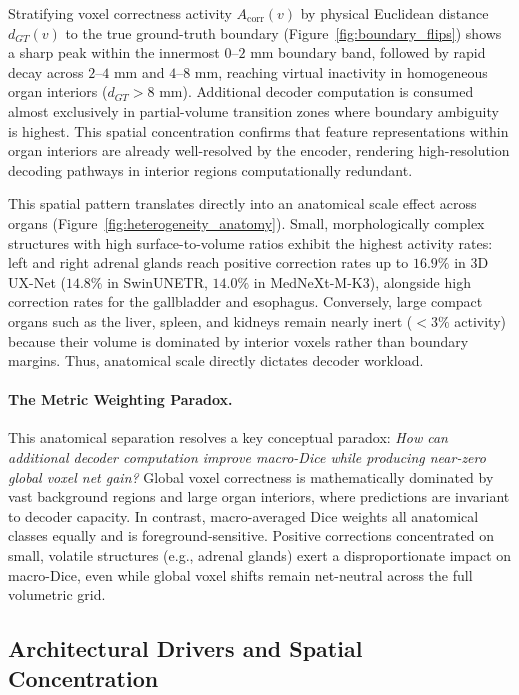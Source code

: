 Stratifying voxel correctness activity $A_{\text{corr}}(v)$ by physical Euclidean distance $d_{GT}(v)$ to the true ground-truth boundary (Figure~\ref{fig:boundary_flips}) shows a sharp peak within the innermost $0\text{--}2\text{ mm}$ boundary band, followed by rapid decay across $2\text{--}4\text{ mm}$ and $4\text{--}8\text{ mm}$, reaching virtual inactivity in homogeneous organ interiors ($d_{GT} > 8\text{ mm}$). Additional decoder computation is consumed almost exclusively in partial-volume transition zones where boundary ambiguity is highest. This spatial concentration confirms that feature representations within organ interiors are already well-resolved by the encoder, rendering high-resolution decoding pathways in interior regions computationally redundant.

This spatial pattern translates directly into an anatomical scale effect across organs (Figure~\ref{fig:heterogeneity_anatomy}). Small, morphologically complex structures with high surface-to-volume ratios exhibit the highest activity rates: left and right adrenal glands reach positive correction rates up to $16.9\%$ in 3D UX-Net ($14.8\%$ in SwinUNETR, $14.0\%$ in MedNeXt-M-K3), alongside high correction rates for the gallbladder and esophagus. Conversely, large compact organs such as the liver, spleen, and kidneys remain nearly inert (${<}3\%$ activity) because their volume is dominated by interior voxels rather than boundary margins. Thus, anatomical scale directly dictates decoder workload.

\paragraph{The Metric Weighting Paradox.} This anatomical separation resolves a key conceptual paradox: \emph{How can additional decoder computation improve macro-Dice while producing near-zero global voxel net gain?} Global voxel correctness is mathematically dominated by vast background regions and large organ interiors, where predictions are invariant to decoder capacity. In contrast, macro-averaged Dice weights all anatomical classes equally and is foreground-sensitive. Positive corrections concentrated on small, volatile structures (e.g., adrenal glands) exert a disproportionate impact on macro-Dice, even while global voxel shifts remain net-neutral across the full volumetric grid.

\subsection{Architectural Drivers and Spatial Concentration}
\label{sec:results_drivers}

